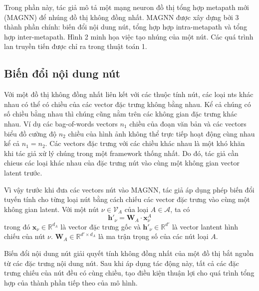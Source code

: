 Trong phần này, tác giả mô tả một mạng neuron đồ thị tổng hợp metapath mới (MAGNN) để nhúng đồ thị không đồng nhất. MAGNN được xây dựng bởi 3 thành phần chính: biến đổi nội dung nút, tổng hợp hợp intra-metapath và tổng hợp inter-metapath. Hình 2 minh họa việc tạo nhúng của một nút. Các quá trình lan truyền tiến được chỉ ra trong thuật toán 1.

\subsection{Biến đổi nội dung nút}
Với một đồ thị không đồng nhất liên kết với các thuộc tính nút, các loại nts khác nhau có thể có chiều của các vector đặc trưng không bằng nhau. Kể cả chúng có số chiều bằng nhau thì chúng cũng nằm trên các không gian đặc trưng khác nhau. Ví dụ các bag-of-words vectors $n_1$ chiều của đoạn văn bản và các vectors biểu đồ cường độ $n_2$ chiều của hình ảnh không thể  trực tiếp hoạt động cùng nhau kể cả $n_1 = n_2$. Các vectors đặc trưng với các chiều khác nhau là một khó khăn khi tác giả xử lý chúng trong một framework thống nhất. Do đó, tác giả cần chieus các loại khác nhau của đặc trưng nút vào cùng một không gian vector latent trước.

Vì vậy trước khi đưa các vectors nút vào MAGNN, tác giả áp dụng phép biến đổi tuyến tính cho từng loại nút bằng cách chiếu các vector đặc trưng vào cùng một không gian latent. Với một nút $\nu \in \pmb{\mathcal{V}}_A$ của loại $A \in \pmb{\mathcal{A}}$, ta có
\begin{equation}
  \mathbf{h'}_{\nu} = \mathbf{W}_A \cdot \mathbf{x}^A_{\nu}
\end{equation}
trong đó $\mathbf{x}_{\nu} \in \mathbb{R}^{d_A}$ là vector đặc trưng gốc và $\mathbf{h'}_{\nu} \in \mathbb{R}^{d'}$ là vector lantent hình chiếu  của nút $\nu$. $\mathbf{W}_A \in \mathbb{R}^{d' \times d_A}$ là ma trận trọng số của các nút loại $A$.

Biến đổi nội dung nút giải quyết tính không đồng nhất của một đồ thị bắt nguồn từ các đặc trưng nội dung nút. Sau khi áp dụng tác động này, tất cả các đặc trưng chiếu của nút đều có cùng chiều, tạo điều kiện thuận lợi cho quá trình tổng hợp của thành phần tiếp theo của mô hình. 

